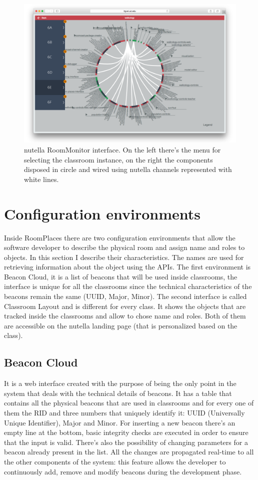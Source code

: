 \begin{figure}
\centering
\includegraphics[width=6in]{images/nutella-monitor.png}
\caption{nutella RoomMonitor interface. On the left there's the menu for selecting the classroom instance, on the right the components disposed in circle and wired using nutella channels represented with white lines.}
\label{fig:nutella_monitor}
\end{figure}

\section{Configuration environments}
Inside RoomPlaces there are two configuration environments that allow the software developer to describe the physical room and assign name and roles to objects. In this section I describe their characteristics. The names are used for retrieving information about the object using the APIs. The first environment is Beacon Cloud, it is a list of beacons that will be used inside classrooms, the interface is unique for all the classrooms since the technical characteristics of the beacons remain the same (UUID, Major, Minor). The second interface is called Classroom Layout and is different for every class. It shows the objects that are tracked inside the classrooms and allow to chose name and roles. Both of them are accessible on the nutella landing page (that is personalized based on the class).

\subsection{Beacon Cloud}
It is a web interface created with the purpose of being the only point in the system that deals with the technical details of beacons. It has a table that contains all the physical beacons that are used in classrooms and for every one of them the RID and three numbers that uniquely identify it: UUID (Universally Unique Identifier), Major and Minor. For inserting a new beacon there's an empty line at the bottom, basic integrity checks are executed in order to ensure that the input is valid. There's also the possibility of changing parameters for a beacon already present in the list. All the changes are propagated real-time to all the other components of the system: this feature allows the developer to continuously add, remove and modify beacons during the development phase.

